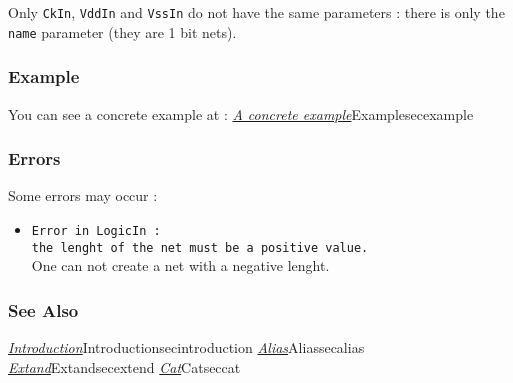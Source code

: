 \indent Only \verb-CkIn-, \verb-VddIn- and \verb-VssIn- do not have the same parameters : there is only the \verb-name- parameter (they are 1 bit nets).
    
\subsubsection{Example}

You can see a concrete example at : \hyperref[ref]{\emph{A concrete example}}{}{Example}{secexample}
    
\subsubsection{Errors}
    
Some errors may occur :
\begin{itemize}
    \item \verb-Error in LogicIn :-\\\verb-the lenght of the net must be a positive value.-\\One can not create a net with a negative lenght.
\end{itemize}

\subsubsection{See Also}

\hyperref[ref]{\emph{Introduction}}{}{Introduction}{secintroduction}
\hyperref[ref]{\emph{Alias}}{}{Alias}{secalias}
\hyperref[ref]{\emph{Extand}}{}{Extand}{secextend}
\hyperref[ref]{\emph{Cat}}{}{Cat}{seccat}
